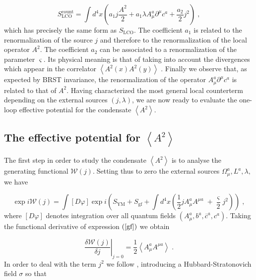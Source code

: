 \documentclass[a4paper,12pt]{article}
\begin{document}
\begin{equation}
S_{\mathrm{LCO}}^{\mathrm{count}}=\int d^{4}x\left( a_{1}j\frac{A^{2}}{2}%
+a_{1}\lambda A_{\mu }^{a}\partial ^{\mu }c^{a}+\frac{a_{2}}{2}j^{2}\right)
\;,  \label{ctf}
\end{equation}
which has precisely the same form as $S_{\mathrm{LCO}}$. The coefficient $%
a_{1}$ is related to the renormalization of the source $j$ and therefore to
the renormalization of the local operator $A^{2}.$ The coefficient $a_{2}$
can be associated to a renormalization of the parameter $\varsigma $. Its
physical meaning is that of taking into account the divergences which appear
in the correlator $\left\langle A^{2}(x)A^{2}(y)\right\rangle \;$\cite{v1}.
Finally we observe that, as expected by BRST invariance, the renormalization
of the operator $A_{\mu }^{a}\partial ^{\mu }c^{a}$ is related to that of $%
A^{2}$. Having characterized the most general local counterterm depending on
the external sources $\left( j,\lambda \right) $, we are now ready to
evaluate the one-loop effective potential for the condensate $\left\langle
A^{2}\right\rangle $.

\subsection{The effective potential for $\left\langle A^{2}\right\rangle $}

The first step in order to study the condensate $\left\langle
A^{2}\right\rangle $ is to analyse the generating functional $\mathcal{W}%
(j).\;$Setting thus to zero the external sources $\Omega _{\mu
}^{a},L^{a},\lambda ,\;$we have

\begin{equation}
\exp i\mathcal{W}(j)=\int \left[ D\varphi \right] \exp i\left( S_{\mathrm{YM}%
}+S_{\mathrm{gf}}+\int d^{4}x\left( \frac{1}{2}jA_{\mu }^{a}A^{\mu a}\;+%
\frac{\varsigma }{2}j^{2}\right) \right) \;,  \label{gf}
\end{equation}
where $\left[ D\varphi \right] $ denotes integration over all quantum fields 
$(A_{\mu }^{a},b^{a},\overline{c}^{a},c^{a})$. Taking the functional
derivative of expression $\left( \ref{gf}\right) $ we obtain

\begin{equation}
\left. \frac{\delta \mathcal{W}(j)}{\delta j}\right| _{j=0}=\frac{1}{2}%
\left\langle A_{\mu }^{a}A^{\mu a}\right\rangle \;.  \label{djw}
\end{equation}
In order to deal with the term $j^{2}$ we follow \cite{v1}, introducing a
Hubbard-Stratonovich field $\sigma $ so that
\end{document}
